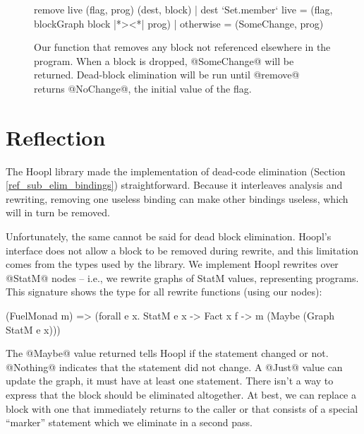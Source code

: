 \documentclass[12pt]{report}
\begin{document}
\begin{figure}[h]
  \begin{code}
remove live (flag, prog) (dest, block)
  | dest `Set.member` live = (flag, blockGraph block |*><*| prog)
  | otherwise = (SomeChange, prog)
  \end{code}
  \caption{Our function that removes any block not referenced
    elsewhere in the program. When a block is dropped, @SomeChange@
    will be returned. Dead-block elimination will be run until
    @remove@ returns @NoChange@, the initial value of the flag.}
  \label{ref_figure_remove}
\end{figure}

\section{Reflection}

The Hoopl library made the implementation of dead-code elimination
(Section \ref{ref_sub_elim_bindings}) straightforward. Because it
interleaves analysis and rewriting, removing one useless binding
can make other bindings useless, which will in turn be removed.

Unfortunately, the same cannot be said for dead block
elimination. Hoopl's interface does not allow a block to be removed
during rewrite, and this limitation comes from the types used by
the library. We implement Hoopl rewrites over @StatM@ nodes -- i.e., we rewrite
graphs of StatM values, representing programs. This signature shows the type for all  rewrite functions (using our nodes):

\begin{code}
(FuelMonad m) => (forall e x.
  StatM e x
  -> Fact x f
  -> m (Maybe (Graph StatM e x)))
\end{code}

The @Maybe@ value returned tells Hoopl if the statement changed or
not. @Nothing@ indicates that the statement did not change. A
@Just@ value can update the graph, it must have at least one
statement. There isn't a way to express that the block should be
eliminated altogether. At best, we can replace a block with one that
immediately returns to the caller or that consists of a special
``marker'' statement which we eliminate in a second pass.
\end{document}
